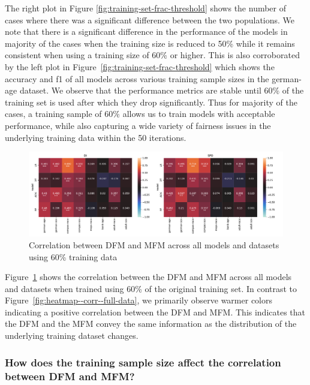 \documentclass{article}
\begin{document}
The right plot in Figure \ref{fig:training-set-frac-threshold} shows
the number of cases where there was a significant difference between
the two populations. We note that there is a significant difference in
the performance of the models in majority of the cases when the
training size is reduced to 50\% while it remains consistent when
using a training size of 60\% or higher. This is also corroborated by
the left plot in Figure \ref{fig:training-set-frac-threshold} which
shows the accuracy and f1 of all models across various training sample
sizes in the german-age dataset. We observe that the performance
metrics are stable until 60\% of the training set is used after which
they drop significantly. Thus for majority of the cases, a training
sample of 60\% allows us to train models with acceptable performance,
while also capturing a wide variety of fairness issues in the
underlying training data within the 50 iterations.

\begin{figure}
  \centering
  \includegraphics[width=0.95\linewidth]{heatmap--corr--training-sets-frac.pdf}
  \caption{Correlation between DFM and MFM across all models and
    datasets using 60\% training data}
  \label{fig:heatmap--corr--training-sets-frac}
\end{figure}

Figure \ref{fig:heatmap--corr--training-sets-frac} shows the
correlation between the DFM and MFM across all models and datasets
when trained using 60\% of the original training set. In contrast to
Figure \ref{fig:heatmap--corr--full-data}, we primarily observe warmer
colors indicating a positive correlation between the DFM and MFM. This
indicates that the DFM and the MFM convey the same information as the
distribution of the underlying training dataset changes.

\subsubsection{How does the training sample size affect the correlation between DFM and MFM?}\label{sec:results-corr-frac}
\end{document}
